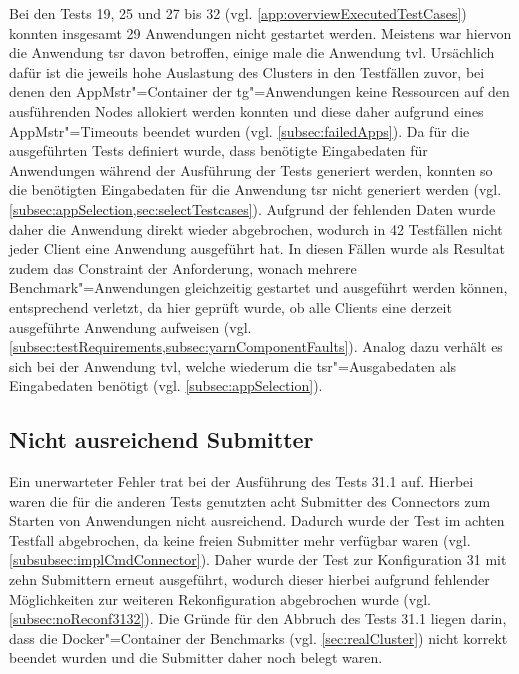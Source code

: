 Bei den Tests 19, 25 und 27 bis 32  (vgl. \cref{app:overviewExecutedTestCases}) konnten insgesamt 29 Anwendungen nicht gestartet werden.
Meistens war hiervon die Anwendung \acrlong{tsr} davon betroffen, einige male die Anwendung \acrlong{tvl}.
Ursächlich dafür ist die jeweils hohe Auslastung des Clusters in den Testfällen zuvor, bei denen den \gls{AppMstr}"=Container der \acrlong{tg}"=Anwendungen keine Ressourcen auf den ausführenden Nodes allokiert werden konnten und diese daher aufgrund eines \gls{AppMstr}"=Timeouts beendet wurden (vgl. \cref{subsec:failedApps}).
Da für die ausgeführten Tests definiert wurde, dass benötigte Eingabedaten für Anwendungen während der Ausführung der Tests generiert werden, konnten so die benötigten Eingabedaten für die Anwendung \acrlong{tsr} nicht generiert werden (vgl. \cref{subsec:appSelection,sec:selectTestcases}).
Aufgrund der fehlenden Daten wurde daher die Anwendung direkt wieder abgebrochen, wodurch in 42 Testfällen nicht jeder Client eine Anwendung ausgeführt hat.
In diesen Fällen wurde als Resultat zudem das Constraint der Anforderung, wonach mehrere Benchmark"=Anwendungen gleichzeitig gestartet und ausgeführt werden können, entsprechend verletzt, da hier geprüft wurde, ob alle Clients eine derzeit ausgeführte Anwendung aufweisen (vgl. \cref{subsec:testRequirements,subsec:yarnComponentFaults}).
Analog dazu verhält es sich bei der Anwendung \acrlong{tvl}, welche wiederum die \acrlong{tsr}"=Ausgabedaten als Eingabedaten benötigt (vgl. \cref{subsec:appSelection}).

\subsection{Nicht ausreichend Submitter}
\label{subsec:notEnoughSubmitter}

Ein unerwarteter Fehler trat bei der Ausführung des Tests 31.1 auf.
Hierbei waren die für die anderen Tests genutzten acht Submitter des Connectors zum Starten von Anwendungen nicht ausreichend.
Dadurch wurde der Test im achten Testfall abgebrochen, da keine freien Submitter mehr verfügbar waren (vgl. \cref{subsubsec:implCmdConnector}).
Daher wurde der Test zur Konfiguration 31 mit zehn Submittern erneut ausgeführt, wodurch dieser hierbei aufgrund fehlender Möglichkeiten zur weiteren Rekonfiguration abgebrochen wurde (vgl. \cref{subsec:noReconf3132}).
Die Gründe für den Abbruch des Tests 31.1 liegen darin, dass die Docker"=Container der Benchmarks (vgl. \cref{sec:realCluster}) nicht korrekt beendet wurden und die Submitter daher noch belegt waren.
